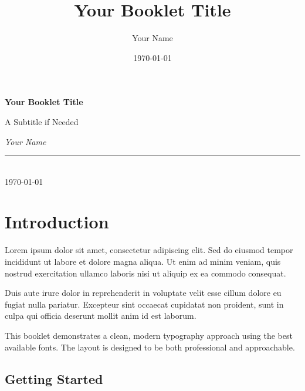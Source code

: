 \documentclass[11pt,twoside,openright,twocolumn]{book}
\title{Your Booklet Title}
\author{Your Name}
\date{\today}
\begin{document}
\begin{titlepage}
    \onecolumn  %
    \centering
    \vspace*{2cm}
    
    {\huge\bfseries\color{darkblue} Your Booklet Title \par}
    \vspace{1cm}
    {\Large A Subtitle if Needed \par}
    
    \vspace{3cm}
    {\Large\itshape Your Name \par}
    
    \vfill
    
    \begin{center}
        \rule{4cm}{0.5pt} \\[0.5cm]
        {\large \today}
    \end{center}
    
    \vspace{2cm}
\end{titlepage}

\onecolumn  %
\tableofcontents
\cleardoublepage
\twocolumn  %


\chapter{Introduction}

Lorem ipsum dolor sit amet, consectetur adipiscing elit. Sed do eiusmod tempor incididunt ut labore et dolore magna aliqua. Ut enim ad minim veniam, quis nostrud exercitation ullamco laboris nisi ut aliquip ex ea commodo consequat.

Duis aute irure dolor in reprehenderit in voluptate velit esse cillum dolore eu fugiat nulla pariatur. Excepteur sint occaecat cupidatat non proident, sunt in culpa qui officia deserunt mollit anim id est laborum.

This booklet demonstrates a clean, modern typography approach using the best available fonts. The layout is designed to be both professional and approachable.

\section{Getting Started}
\end{document}
